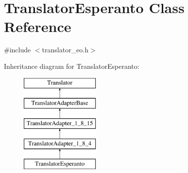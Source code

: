 \hypertarget{class_translator_esperanto}{}\section{Translator\+Esperanto Class Reference}
\label{class_translator_esperanto}


{\ttfamily \#include $<$translator\+\_\+eo.\+h$>$}

Inheritance diagram for Translator\+Esperanto\+:\begin{figure}[H]
\begin{center}
\leavevmode
\includegraphics[height=5.000000cm]{class_translator_esperanto}
\end{center}
\end{figure}
